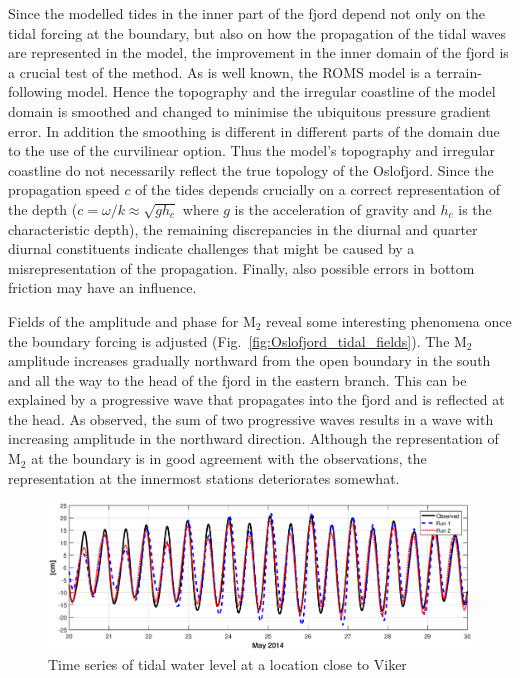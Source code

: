 Since the modelled tides in the inner part of the fjord depend not only on the tidal forcing at the boundary, but also on how the propagation of the tidal waves are represented in the model, the improvement in the inner domain of the fjord is a crucial test of the method. As is well known, the ROMS model is a terrain-following model. Hence the topography and the irregular coastline of the model domain is smoothed and changed to minimise the ubiquitous pressure gradient error. In addition the smoothing is different in different parts of the domain due to the use of the curvilinear option. Thus the model's topography and irregular coastline do not necessarily reflect the true topology of the Oslofjord. Since the propagation speed $c$ of the tides depends crucially on a correct representation of the depth ($c = \omega/k \approx \sqrt{g h_c}$ where $g$ is the acceleration of gravity and $h_c$ is the characteristic depth), the remaining discrepancies in the diurnal and quarter diurnal constituents indicate challenges that might be caused by a misrepresentation of the propagation. Finally, also possible errors in bottom friction may have an influence.

Fields of the amplitude and phase for M$_2$ reveal some interesting phenomena once the boundary forcing is adjusted (Fig.~\ref{fig:Oslofjord_tidal_fields}). The M$_2$ amplitude increases gradually northward from the open boundary in the south and all the way to the head of the fjord in the eastern branch. This can be explained by a progressive wave that propagates into the fjord and is reflected at the head. As observed, the sum of two progressive waves results in a wave with increasing amplitude in the northward direction. Although the representation of M$_2$ at the boundary is in good agreement with the observations, the representation at the innermost stations deteriorates somewhat.


\begin{figure}[!t]
\centering
\includegraphics[width=\textwidth]{fig_Viker_timeseries}
\caption{Time series of tidal water level at a location close to Viker}
\label{fig:Viker_timeseries}
\end{figure}

